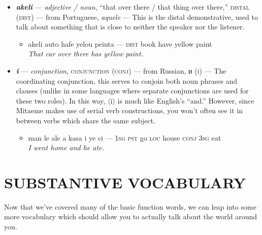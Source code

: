 \documentclass[a4paper]{article}
\begin{document}
\begin{itemize}
	\begin{itemize}
		\item man na kan yena puka — \textsc{1sg neg} read \textsc{medi} book \\\textit{I am not reading that book. / I have not read that book.}
	\end{itemize}
	\item \textbf{\textit{akeli}} — \textit{adjective / noun}, ``that over there / that thing over there,'' \textsc{distal (dist)}  — from Portuguese, \textit{aquele} — This is the distal demonstrative, used to talk about something that is close to neither the speaker nor the listener.
	\begin{itemize}
		\item akeli auto hafe yelou peinta — \textsc{dist} book have yellow paint \\\textit{That car over there has yellow paint.}
	\end{itemize}
	\item \textbf{\textit{i}} — \textit{conjunction}, \textsc{conjunction (conj)}  — from Russian, и (i) — The coordinating conjunction, this serves to conjoin both noun phrases and clauses (unlike in some languages where separate conjunctions are used for these two roles). In this way, $\langle$i$\rangle$ is much like English's ``and.'' However, since Mitaeme makes use of serial verb constructions, you won't often see it in between verbs which share the same subject.
	\begin{itemize}
		\item man le ale a kasa i ye ci — \textsc{1sg pst} go \textsc{loc} house \textsc{conj 3sg} eat \\\textit{I went home and he ate.}
	\end{itemize}
\end{itemize}

\section{SUBSTANTIVE VOCABULARY}

Now that we've covered many of the basic function words, we can leap into some more vocabulary which should allow you to actually talk about the world around you.
\end{document}
